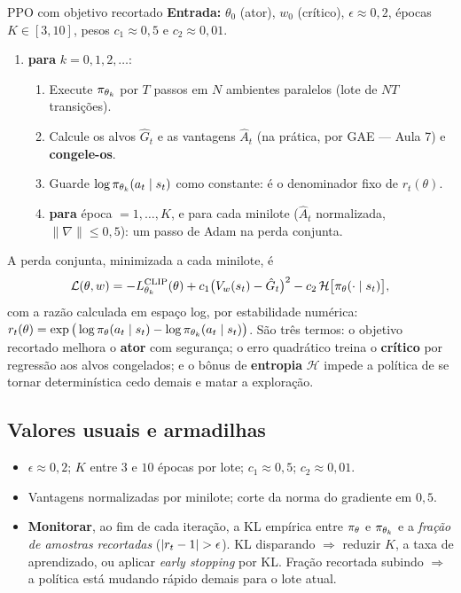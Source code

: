 \documentclass[11pt, a4paper]{article}
\newcommand{\Ahat}{\hat{A}}
\begin{document}
\begin{algbox}{PPO com objetivo recortado}
\textbf{Entrada:} $\theta_0$ (ator), $w_0$ (crítico), $\epsilon \approx 0{,}2$,
épocas $K\in[3,10]$, pesos $c_1\approx 0{,}5$ e $c_2\approx 0{,}01$.
\begin{enumerate}[leftmargin=1.6em, itemsep=0.1em]
  \item \textbf{para} $k = 0,1,2,\dots$:
  \begin{enumerate}[leftmargin=1.4em, itemsep=0.05em, label=\alph*)]
    \item Execute $\pi_{\theta_k}$ por $T$ passos em $N$ ambientes paralelos
          (lote de $NT$ transições).
    \item Calcule os alvos $\hat G_t$ e as vantagens $\Ahat_t$ (na prática, por
          GAE --- Aula 7) e \textbf{congele-os}.
    \item Guarde $\log \pi_{\theta_k}(a_t\mid s_t)$ como constante: é o
          denominador fixo de $r_t(\theta)$.
    \item \textbf{para} época $=1,\dots,K$, e para cada minilote ($\Ahat_t$
          normalizada, $\|\nabla\|\le 0{,}5$): um passo de Adam na perda conjunta.
  \end{enumerate}
\end{enumerate}
\end{algbox}

A perda conjunta, minimizada a cada minilote, é
\[
  \mathcal{L}(\theta,w) = -L^{\mathrm{CLIP}}_{\theta_k}(\theta)
    + c_1\big(V_w(s_t) - \hat G_t\big)^2 - c_2\,\mathcal{H}\big[\pi_\theta(\cdot\mid s_t)\big],
\]
com a razão calculada em espaço log, por estabilidade numérica:
$r_t(\theta) = \exp\big(\log\pi_\theta(a_t\mid s_t) - \log\pi_{\theta_k}(a_t\mid s_t)\big)$.
São três termos: o objetivo recortado melhora o \textbf{ator} com segurança; o erro
quadrático treina o \textbf{crítico} por regressão aos alvos congelados; e o
bônus de \textbf{entropia} $\mathcal{H}$ impede a política de se tornar
determinística cedo demais e matar a exploração.

\subsection{Valores usuais e armadilhas}

\begin{itemize}
  \item $\epsilon \approx 0{,}2$; \; $K$ entre $3$ e $10$ épocas por lote;
        $c_1 \approx 0{,}5$; \; $c_2 \approx 0{,}01$.
  \item Vantagens normalizadas por minilote; corte da norma do gradiente em
        $0{,}5$.
  \item \textbf{Monitorar}, ao fim de cada iteração, a KL empírica entre
        $\pi_\theta$ e $\pi_{\theta_k}$ e a \emph{fração de amostras recortadas}
        ($\lvert r_t - 1\rvert > \epsilon$). KL disparando $\Rightarrow$ reduzir $K$, a
        taxa de aprendizado, ou aplicar \emph{early stopping} por KL. Fração
        recortada subindo $\Rightarrow$ a política está mudando rápido demais
        para o lote atual.
\end{itemize}
\end{document}
